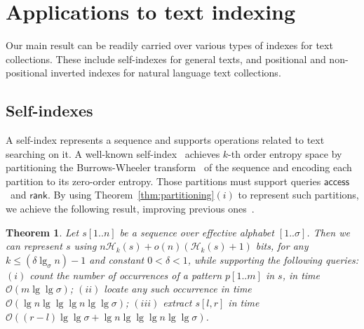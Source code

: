 \documentclass[11pt]{article}
\newtheorem{theorem}{Theorem}
\newcommand{\Oh}[1]
    {\ensuremath{\mathcal{O}\left( {#1} \right)}}
\newcommand{\access}
    {\ensuremath{\mathsf{access}}}
\newcommand{\rank}
    {\ensuremath{\mathsf{rank}}}
\newcommand{\HH}{\mathcal{H}}
\newcommand{\Hk}{\HH_k}
\begin{document}
\section{Applications to text indexing}
\label{sec:app-text}

Our main result can be readily carried over various types of indexes for
text collections. These include self-indexes for general texts, and positional
and non-positional inverted indexes for natural language text collections.

\subsection{Self-indexes}
\label{sec:higher-order}

A self-index represents a sequence and supports
operations related to text searching on it.
A well-known self-index~\cite{FMMN07} achieves $k$-th order entropy space
by partitioning the Burrows-Wheeler transform~\cite{BW94}
of the sequence and encoding
each partition to its zero-order entropy. Those partitions must support
queries \access\ and \rank. By using Theorem~\ref{thm:partitioning}$(i)$ to
represent such partitions, we achieve the following result, improving previous
ones~\cite{FMMN07,GMR06,BHMR07}.

\begin{theorem} \label{thm:self}
  Let $s[1..n]$ be a sequence over effective alphabet $[1..\sigma]$.
Then we can represent $s$ using $n\Hk(s) + o(n) (\Hk (s) + 1)$ bits,
  for any $k \le (\delta \lg_\sigma n)-1$ and constant
  $0<\delta<1$, while supporting the following queries:
$(i)$ count the number of occurrences of a pattern $p[1..m]$ in $s$,
  in time $\Oh{m\lg\lg\sigma}$;
$(ii)$ locate any such occurrence in time $\Oh{\lg n\lg\lg\lg
    n\lg\lg\sigma}$;
$(iii)$ extract $s[l,r]$ in time $\Oh{(r-l) \lg\lg\sigma + \lg
    n\lg\lg\lg n\lg\lg\sigma}$.
\end{theorem}
\end{document}
